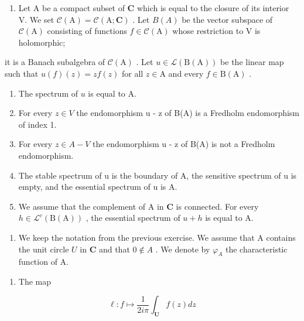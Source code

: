 \exercisesection{}

\begin{enumerate}
\def\labelenumi{\arabic{enumi})}
\tightlist
\item
  Let A be a compact subset of \(\mathbf{C}\) which is equal to the closure of its interior V. We set \(\mathcal{C}(\mathrm{A}) = \mathcal{C}(\mathrm{A};\mathbf{C})\) . Let \(B(A)\) be the vector subspace of \(\mathcal{C}(\mathrm{A})\) consisting of functions \(f\in \mathcal{C}(\mathrm{A})\) whose restriction to V is holomorphic;
\end{enumerate}

it is a Banach subalgebra of \(\mathcal{C}(\mathrm{A})\) . Let \(u \in \mathcal{L}(\mathrm{B}(\mathrm{A}))\) be the linear map such that \(u(f)(z) = zf(z)\) for all \(z \in \mathrm{A}\) and every \(f \in \mathrm{B}(\mathrm{A})\) .

\begin{enumerate}
\def\labelenumi{\alph{enumi})}
\item
  The spectrum of \(u\) is equal to A.
\item
  For every \(z \in V\) the endomorphism u - z of B(A) is a Fredholm endomorphism of index 1.
\item
  For every \(z \in A - V\) the endomorphism u - z of B(A) is not a Fredholm endomorphism.
\item
  The stable spectrum of u is the boundary of A, the sensitive spectrum of u is empty, and the essential spectrum of u is A.
\item
  We assume that the complement of A in \(\mathbf{C}\) is connected. For every \(h \in \mathcal{L}^{c}(\mathrm{B}(\mathrm{A}))\) , the essential spectrum of \(u + h\) is equal to A.
\end{enumerate}

\begin{enumerate}
\def\labelenumi{\arabic{enumi})}
\setcounter{enumi}{1}
\tightlist
\item
  We keep the notation from the previous exercise. We assume that A contains the unit circle \(U\) in \(\mathbf{C}\) and that \(0 \notin A\) . We denote by \(\varphi_{A}\) the characteristic function of A.
\end{enumerate}

\begin{enumerate}
\def\labelenumi{\alph{enumi})}
\tightlist
\item
  The map
\end{enumerate}

\[
\ell \colon f \mapsto \frac {1}{2 i \pi} \int_ {\mathbf {U}} f (z) d z
\]

